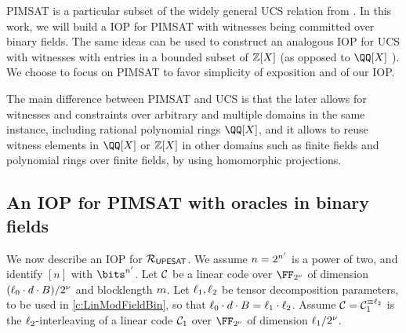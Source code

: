 \documentclass[11pt,letterpaper,usenames,dvipsnames]{article}
\begin{document}
\begin{remark}\label{r:pimsat_vs_ucs}
PIMSAT is a particular subset of the widely general UCS relation from \cite{zincplus}. In this work, we will build a IOP for PIMSAT with witnesses being committed over binary fields. The same ideas can be used to construct an analogous IOP for UCS with witnesses with entries in a bounded subset of $\mathbb{Z}[X]$ (as opposed to $\QQ[X]$ ).  We choose to focus on PIMSAT to favor simplicity of exposition and of our IOP. 

The main difference between PIMSAT and UCS  is that the later allows for witnesses and constraints over arbitrary and multiple domains in the same instance, including rational polynomial rings $\QQ[X]$, and it allows to reuse witness elements in $\QQ[X]$ or $\mathbb{Z}[X]$ in other domains such as finite fields and polynomial rings over finite fields, by using   homomorphic projections.
\end{remark}






\subsection{An IOP for PIMSAT with oracles in binary fields}


We now describe an IOP for $\mathcal{R}_{\mathsf{UPESAT}}$. 
% 
We assume $n=2^{n'}$ is a power of two, and identify $[n]$ with $\bits^{n'}$. 
Let $\mathcal{C}$ be a linear code over $\comfield$ of dimension $(\ell_0\cdot d\cdot B)/2^\nu$ and blocklength $m$. Let $\ell_1,\ell_2$ be tensor decomposition parameters, to be used in \cref{c:LinModFieldBin}, so that $\ell_0\cdot d\cdot B=\ell_1\cdot \ell_2$. Assume $\mathcal{C}=\mathcal{C}_1^{\equiv \ell_2}$ is the $\ell_2$-interleaving  of a linear code $\mathcal{C}_1$ over $\comfield$ of dimension $\ell_1/2^\nu$. 
\end{document}
